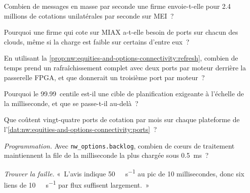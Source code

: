 \begin{exercise}[$\star$]\label{exo:nw:equities-and-options-connectivity:2}
Combien de messages en masse par seconde une firme envoie-t-elle pour 2.4 millions de cotations unilatérales par seconde sur MEI~?
\end{exercise}

\begin{exercise}[$\star$]\label{exo:nw:equities-and-options-connectivity:3}
Pourquoi une firme qui cote sur MIAX a-t-elle besoin de ports sur chacun des clouds, même si la charge est faible sur certains d'entre eux~?
\end{exercise}

\begin{exercise}[$\star\star$]\label{exo:nw:equities-and-options-connectivity:4}
En utilisant la \cref{prop:nw:equities-and-options-connectivity:refresh}, combien de temps prend un rafraîchissement complet avec deux ports par moteur derrière la
passerelle FPGA, et que donnerait un troisième port par moteur~?
\end{exercise}

\begin{exercise}[$\star\star$]\label{exo:nw:equities-and-options-connectivity:5}
Pourquoi le 99.99~centile est-il une cible de planification exigeante à l'échelle de la milliseconde, et que se passe-t-il au-delà~?
\end{exercise}

\begin{exercise}[$\star\star$]\label{exo:nw:equities-and-options-connectivity:6}
Que coûtent vingt-quatre ports de cotation par mois sur chaque plateforme de l'\cref{dat:nw:equities-and-options-connectivity:ports}~?
\end{exercise}

\begin{exercise}[$\star\star\star$]\label{exo:nw:equities-and-options-connectivity:7}
\emph{Programmation.} Avec \texttt{nw\_options.backlog}, combien de cœurs de traitement maintiennent la file de la milliseconde la plus chargée sous
\qty{0.5}{\milli\second}~?
\end{exercise}

\begin{exercise}[$\star\star\star$]\label{exo:nw:equities-and-options-connectivity:8}
\emph{Trouver la faille.} «~L'avis indique \qty{50}{\giga\bit\per\second} au pic de 10 millisecondes, donc six
liens de \qty{10}{\giga\bit\per\second} par flux suffisent largement.~»
\end{exercise}

